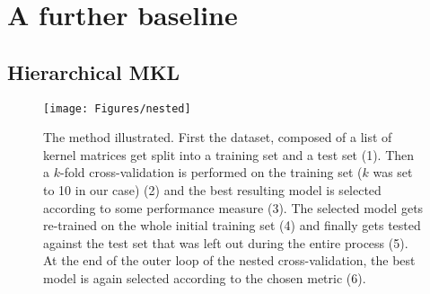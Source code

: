 \chapter{A further baseline}
\label{AppendixA}


\section{Hierarchical MKL}
\label{subsec:hierarchy}


\begin{figure}[ht]
    \centering
    \texttt{[image: Figures/nested]}
    \caption{The method illustrated. First the dataset, composed of a list of
    kernel matrices get split into a training set and a test set (1).
    Then a $k$-fold cross-validation is performed on the training set ($k$ was set to
    10 in our case) (2) and the best resulting model is selected according to some
    performance measure (3). The selected model gets re-trained on the whole initial
    training set (4) and finally gets tested against the test set that was left out
    during the entire process (5). At the end of the outer loop of the nested
    cross-validation, the best model is again selected according to the chosen
    metric (6).}
    \label{fig:hmethod}
\end{figure}

